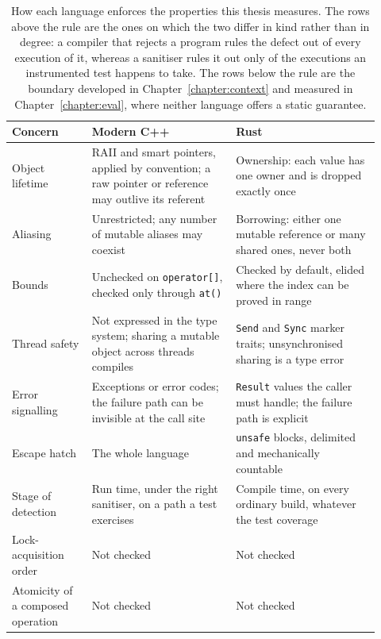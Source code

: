 \documentclass[english,twoside,openright,a4paper,censored,csm,software-track-2020]{HYthesisML}
\begin{document}
\begin{table}
\centering
\small
\caption[How each language enforces the properties measured here]{How each language enforces the properties this thesis measures. The rows above the
rule are the ones on which the two differ in kind rather than in degree: a compiler that
rejects a program rules the defect out of every execution of it, whereas a sanitiser rules it
out only of the executions an instrumented test happens to take. The rows below the rule are
the boundary developed in Chapter~\ref{chapter:context} and measured in
Chapter~\ref{chapter:eval}, where neither language offers a static
guarantee.\label{tab:langmodel}}
\renewcommand{\arraystretch}{1.2}
\begin{tabular}{@{}R{0.20\linewidth} R{0.36\linewidth} R{0.36\linewidth}@{}}
\hline\hline
Concern & Modern C++ & Rust \\
\hline
Object lifetime & RAII and smart pointers, applied by convention; a raw pointer or reference may outlive its referent & Ownership: each value has one owner and is dropped exactly once \\
Aliasing & Unrestricted; any number of mutable aliases may coexist & Borrowing: either one mutable reference or many shared ones, never both \\
Bounds & Unchecked on \texttt{operator[]}, checked only through \texttt{at()} & Checked by default, elided where the index can be proved in range \\
Thread safety & Not expressed in the type system; sharing a mutable object across threads compiles & \texttt{Send} and \texttt{Sync} marker traits; unsynchronised sharing is a type error \\
Error signalling & Exceptions or error codes; the failure path can be invisible at the call site & \texttt{Result} values the caller must handle; the failure path is explicit \\
Escape hatch & The whole language & \texttt{unsafe} blocks, delimited and mechanically countable \\
Stage of detection & Run time, under the right sanitiser, on a path a test exercises & Compile time, on every ordinary build, whatever the test coverage \\
\hline
Lock-acquisition order & Not checked & Not checked \\
Atomicity of a composed operation & Not checked & Not checked \\
\hline
\end{tabular}
\end{table}
\end{document}
